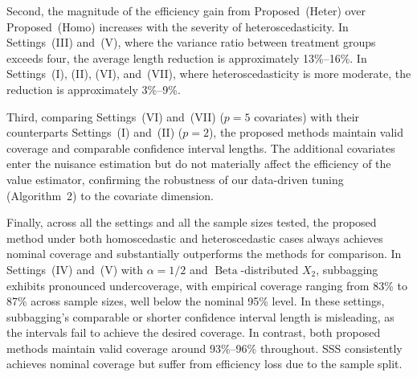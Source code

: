\documentclass[11pt]{article}
\theoremstyle{referenceplain}
\theoremstyle{referencedefinition}
\theoremstyle{referenceremark}
\begin{document}
Second, the magnitude of the efficiency gain from Proposed~(Heter) over
Proposed~(Homo) increases with the severity of heteroscedasticity. In
Settings~(III) and~(V), where the variance ratio between treatment groups
exceeds four, the average length reduction is approximately 13\%--16\%. In
Settings~(I), (II), (VI), and~(VII), where heteroscedasticity is more moderate, the
reduction is approximately 3\%--9\%.

Third, comparing Settings~(VI) and~(VII) ($p = 5$ covariates) with their counterparts Settings~(I) and~(II) ($p = 2$), the proposed methods maintain valid coverage and comparable confidence interval lengths. The additional covariates enter the nuisance estimation but do not materially affect the efficiency of the value estimator, confirming the robustness of our data-driven tuning (Algorithm~2) to the covariate dimension.

Finally, across all the settings and all the sample sizes tested, the proposed method under both homoscedastic and heteroscedastic cases always achieves nominal coverage and substantially outperforms the methods for comparison. In
Settings~(IV) and~(V) with $\alpha = 1/2$ and
$\operatorname{Beta}$-distributed $X_2$, subbagging exhibits pronounced
undercoverage, with empirical coverage ranging from 83\% to 87\% across
sample sizes, well below the nominal 95\% level. In these settings,
subbagging's comparable or shorter confidence interval length is
misleading, as the intervals fail to achieve the desired coverage. In
contrast, both proposed methods maintain valid coverage around 93\%--96\%
throughout. SSS consistently achieves nominal coverage but suffer from efficiency loss due to the sample split.
\end{document}
